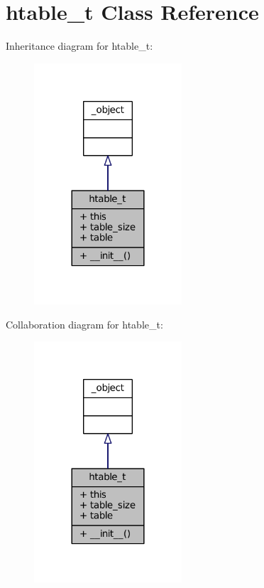\hypertarget{classlibntoh_1_1htable__t}{\section{htable\-\_\-t Class Reference}
\label{classlibntoh_1_1htable__t}
}


Inheritance diagram for htable\-\_\-t\-:
\nopagebreak
\begin{figure}[H]
\begin{center}
\leavevmode
\includegraphics[width=156pt]{classlibntoh_1_1htable__t__inherit__graph}
\end{center}
\end{figure}


Collaboration diagram for htable\-\_\-t\-:
\nopagebreak
\begin{figure}[H]
\begin{center}
\leavevmode
\includegraphics[width=156pt]{classlibntoh_1_1htable__t__coll__graph}
\end{center}
\end{figure}
